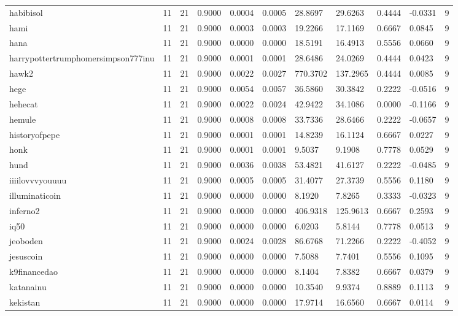 \begin{table}[htbp]
\begin{tabular}{lllllllllll}
habibisol & 11 & 21 & 0.9000 & 0.0004 & 0.0005 & 28.8697 & 29.6263 & 0.4444 & -0.0331 & 9 \\
hami & 11 & 21 & 0.9000 & 0.0003 & 0.0003 & 19.2266 & 17.1169 & 0.6667 & 0.0845 & 9 \\
hana & 11 & 21 & 0.9000 & 0.0000 & 0.0000 & 18.5191 & 16.4913 & 0.5556 & 0.0660 & 9 \\
harrypottertrumphomersimpson777inu & 11 & 21 & 0.9000 & 0.0001 & 0.0001 & 28.6486 & 24.0269 & 0.4444 & 0.0423 & 9 \\
hawk2 & 11 & 21 & 0.9000 & 0.0022 & 0.0027 & 770.3702 & 137.2965 & 0.4444 & 0.0085 & 9 \\
hege & 11 & 21 & 0.9000 & 0.0054 & 0.0057 & 36.5860 & 30.3842 & 0.2222 & -0.0516 & 9 \\
hehecat & 11 & 21 & 0.9000 & 0.0022 & 0.0024 & 42.9422 & 34.1086 & 0.0000 & -0.1166 & 9 \\
hemule & 11 & 21 & 0.9000 & 0.0008 & 0.0008 & 33.7336 & 28.6466 & 0.2222 & -0.0657 & 9 \\
historyofpepe & 11 & 21 & 0.9000 & 0.0001 & 0.0001 & 14.8239 & 16.1124 & 0.6667 & 0.0227 & 9 \\
honk & 11 & 21 & 0.9000 & 0.0001 & 0.0001 & 9.5037 & 9.1908 & 0.7778 & 0.0529 & 9 \\
hund & 11 & 21 & 0.9000 & 0.0036 & 0.0038 & 53.4821 & 41.6127 & 0.2222 & -0.0485 & 9 \\
iiiilovvvyouuuu & 11 & 21 & 0.9000 & 0.0005 & 0.0005 & 31.4077 & 27.3739 & 0.5556 & 0.1180 & 9 \\
illuminaticoin & 11 & 21 & 0.9000 & 0.0000 & 0.0000 & 8.1920 & 7.8265 & 0.3333 & -0.0323 & 9 \\
inferno2 & 11 & 21 & 0.9000 & 0.0000 & 0.0000 & 406.9318 & 125.9613 & 0.6667 & 0.2593 & 9 \\
iq50 & 11 & 21 & 0.9000 & 0.0000 & 0.0000 & 6.0203 & 5.8144 & 0.7778 & 0.0513 & 9 \\
jeoboden & 11 & 21 & 0.9000 & 0.0024 & 0.0028 & 86.6768 & 71.2266 & 0.2222 & -0.4052 & 9 \\
jesuscoin & 11 & 21 & 0.9000 & 0.0000 & 0.0000 & 7.5088 & 7.7401 & 0.5556 & 0.1095 & 9 \\
k9financedao & 11 & 21 & 0.9000 & 0.0000 & 0.0000 & 8.1404 & 7.8382 & 0.6667 & 0.0379 & 9 \\
katanainu & 11 & 21 & 0.9000 & 0.0000 & 0.0000 & 10.3540 & 9.9374 & 0.8889 & 0.1113 & 9 \\
kekistan & 11 & 21 & 0.9000 & 0.0000 & 0.0000 & 17.9714 & 16.6560 & 0.6667 & 0.0114 & 9 \\

\end{tabular}
\end{table}
